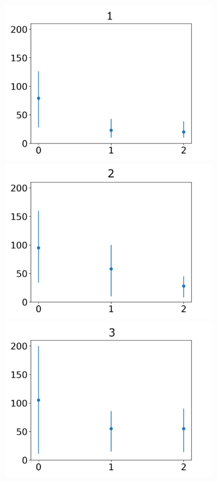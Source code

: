 \documentclass[journal]{IEEEtran}
\begin{document}
{{\begin{figure}[h!]
\begin{subfigure}{0.5\textwidth}
\centering
\includegraphics[scale=0.27]{Images/Average_steps/a.png}
\includegraphics[scale=0.27]{Images/Average_steps/b.png}
\centering
\includegraphics[scale=0.27]{Images/Average_steps/c.png}

\end{subfigure}
\end{figure}}}
\end{document}
